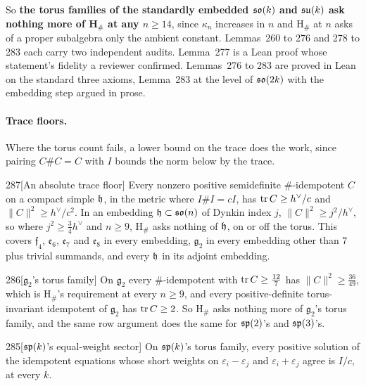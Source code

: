 So \textbf{the torus families of the standardly embedded $\mathfrak{so}(k)$ and $\mathfrak{su}(k)$ ask nothing more of H$_\#$ at any $n\ge14$}, since $\kappa_n$ increases in $n$ and H$_\#$ at $n$ asks of a proper subalgebra only the ambient constant. Lemmas~260 to 276 and 278 to 283 each carry two independent audits. Lemma~277 is a Lean proof whose statement's fidelity a reviewer confirmed. Lemmas~276 to 283 are proved in Lean on the standard three axioms, Lemma~283 at the level of $\mathfrak{so}(2k)$ with the embedding step argued in prose.

\paragraph{Trace floors.} Where the torus count fails, a lower bound on the trace does the work, since pairing $C\#C=C$ with $I$ bounds the norm below by the trace.

\begin{Lem}{287}[An absolute trace floor]
Every nonzero positive semidefinite $\#$-idempotent $C$ on a compact simple $\mathfrak{h}$, in the metric where $I\#I=cI$, has $\operatorname{tr} C\ge h^\vee/c$ and $\lVert C\rVert^2\ge h^\vee/c^2$. In an embedding $\mathfrak{h}\subset\mathfrak{so}(n)$ of Dynkin index $j$, $\lVert C\rVert^2\ge j^2/h^\vee$, so where $j^2\ge\tfrac34h^\vee$ and $n\ge9$, H$_\#$ asks nothing of $\mathfrak{h}$, on or off the torus. This covers $\mathfrak f_4$, $\mathfrak e_6$, $\mathfrak e_7$ and $\mathfrak e_8$ in every embedding, $\mathfrak g_2$ in every embedding other than $7$ plus trivial summands, and every $\mathfrak{h}$ in its adjoint embedding.
\end{Lem}

\begin{Lem}{286}[$\mathfrak g_2$'s torus family]
On $\mathfrak g_2$ every $\#$-idempotent with $\operatorname{tr} C\ge\tfrac{12}7$ has $\lVert C\rVert^2\ge\tfrac{36}{49}$, which is H$_\#$'s requirement at every $n\ge9$, and every positive-definite torus-invariant idempotent of $\mathfrak g_2$ has $\operatorname{tr} C\ge2$. So H$_\#$ asks nothing more of $\mathfrak g_2$'s torus family, and the same row argument does the same for $\mathfrak{sp}(2)$'s and $\mathfrak{sp}(3)$'s.
\end{Lem}

\begin{Lem}{285}[$\mathfrak{sp}(k)$'s equal-weight sector]
On $\mathfrak{sp}(k)$'s torus family, every positive solution of the idempotent equations whose short weights on $\varepsilon_i-\varepsilon_j$ and $\varepsilon_i+\varepsilon_j$ agree is $I/c$, at every $k$.
\end{Lem}

